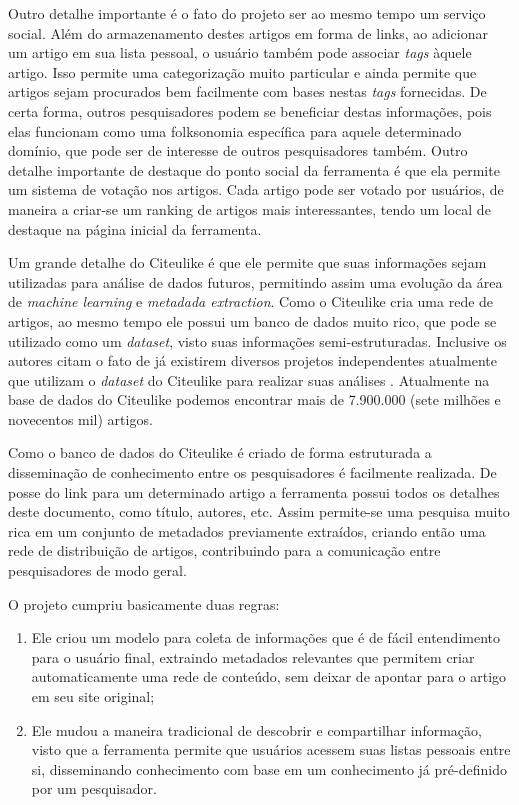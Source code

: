 \begin{textnew}
Outro detalhe importante é o fato do projeto ser ao mesmo tempo um serviço social. Além do armazenamento destes artigos em forma de links, ao adicionar um artigo em sua lista pessoal, o usuário também pode associar \emph{tags} àquele artigo. Isso permite uma categorização muito particular e ainda permite que artigos sejam procurados bem facilmente com bases nestas \emph{tags} fornecidas. De certa forma, outros pesquisadores podem se beneficiar destas informações, pois elas funcionam como uma folksonomia específica para aquele determinado domínio, que pode ser de interesse de outros pesquisadores também. Outro detalhe importante de destaque do ponto social da ferramenta é que ela permite um sistema de votação nos artigos. Cada artigo pode ser votado por usuários, de maneira a criar-se um ranking de artigos mais interessantes, tendo um local de destaque na página inicial da ferramenta.

Um grande detalhe do Citeulike é que ele permite que suas informações sejam utilizadas para análise de dados futuros, permitindo assim uma evolução da área de \emph{machine learning} e \emph{metadada extraction}. Como o Citeulike cria uma rede de artigos, ao mesmo tempo ele possui um banco de dados muito rico, que pode se utilizado como um \emph{dataset}, visto suas informações semi-estruturadas. Inclusive os autores citam o fato de já existirem diversos projetos independentes atualmente que utilizam o \emph{dataset} do Citeulike para realizar suas análises \cite{citeulike}. Atualmente na base de dados do Citeulike podemos encontrar mais de 7.900.000 (sete milhões e novecentos mil) artigos.

Como o banco de dados do Citeulike é criado de forma estruturada a disseminação de conhecimento entre os pesquisadores é facilmente realizada. De posse do link para um determinado artigo a ferramenta possui todos os detalhes deste documento, como título, autores, etc. Assim permite-se uma pesquisa muito rica em um conjunto de metadados previamente extraídos, criando então uma rede de distribuição de artigos, contribuindo para a comunicação entre pesquisadores de modo geral.

O projeto cumpriu basicamente duas regras:

\begin{enumerate}
    \item Ele criou um modelo para coleta de informações que é de fácil entendimento para o usuário final, extraindo metadados relevantes que permitem criar automaticamente uma rede de conteúdo, sem deixar de apontar para o artigo em seu site original;
    \item Ele mudou a maneira tradicional de descobrir e compartilhar informação, visto que a ferramenta permite que usuários acessem suas listas pessoais entre si, disseminando conhecimento com base em um conhecimento já pré-definido por um pesquisador.
\end{enumerate}


\end{textnew}

